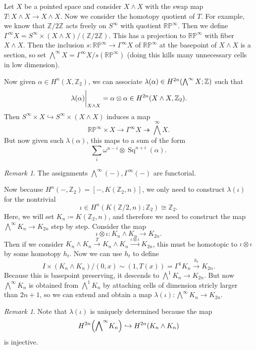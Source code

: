 \documentclass[leqno, openany]{memoir}
\theoremstyle{definition}
\theoremstyle{remark}
\newtheorem{rmk}[thm]{Remark}
\theoremstyle{plain}
\theoremstyle{definition}
\theoremstyle{remark}
\newcommand{\R}{\mathbb{R}}
\newcommand{\Z}{\mathbb{Z}}
\renewcommand{\P}{\mathbb{P}}
\DeclareMathOperator{\Sq}{Sq}
\begin{document}
Let $X$ be a pointed space and consider $X \wedge X$ with the swap map $T \colon X \wedge X \to X \wedge X$. Now we consider the homotopy quotient of $T$. For example, we know that $\Z/2\Z$ acts freely on $S^{\infty}$ with quotient $\R\P^{\infty}$. Then we define $\Gamma^{\infty} X = S^{\infty} \times (X \wedge X) / (\Z/2\Z)$. This has a projection to $\R\P^{\infty}$ with fiber $X \wedge X$. Then the inclusion $s \colon \R\P^{\infty} \to \Gamma^{\infty} X$ of $\R\P^{\infty}$ at the basepoint of $X \wedge X$ is a section, so set $\bigwedge^{\infty} X = \Gamma^{\infty} X / s(\R\P^{\infty})$ (doing this kills many unnecessary cells in low dimension).

Now given $\alpha \in H^n(X, \Z_2)$, we can associate $\lambda(\alpha) \in H^{2n}\qty(\bigwedge^{\infty} X; \Z)$ such that 
\[ \eval{\lambda(\alpha)}_{X \wedge X} = \alpha \otimes \alpha \in H^{2n}(X \wedge X, \Z_2). \] 
Then $S^{\infty} \times X \hookrightarrow S^{\infty} \times (X \wedge X)$ induces a map
\[ \R\P^{\infty} \times X \to \Gamma^{\infty} X \twoheadrightarrow {\bigwedge}^{\infty} X. \]
But now given such $\lambda(\alpha)$, this maps to a sum of the form
\[ \sum_i \omega^{n-i} \otimes \Sq^{n+i}(\alpha). \]

\begin{rmk}
    The assignments $\bigwedge^{\infty}(-), \Gamma^{\infty}(-)$ are functorial.
\end{rmk}

Now because $H^n(-, \Z_2) = [-, K(\Z_2, n)]$, we only need to construct $\lambda(\iota)$ for the nontrivial
\[ \iota \in H^n(K(\Z/2, n); \Z_2) \cong \Z_2. \]
Here, we will set $K_n \coloneqq K(\Z_2, n)$, and therefore we need to construct the map $\bigwedge^{\infty} K_n \to K_{2n}$ step by step. Consider the map
\[ \iota \otimes \iota \colon K_n \wedge K_n \to K_{2n}. \]
Then if we consider $K_n \wedge K_n \xrightarrow{T} K_n \wedge K_n \xrightarrow{\iota \otimes \iota} K_{2n}$, this must be homotopic to $\iota \otimes \iota$ by some homotopy $h_t$. Now we can use $h_t$ to define
\[ I \times (K_n \wedge K_n) / (0,x) \sim (1,T(x)) = \Gamma^1 K_n \xrightarrow{h_t} K_{2n}. \]
Because this is basepoint preserving, it descends to $\bigwedge^1 K_n \to K_{2n}$. But now $\bigwedge^{\infty} K_n$ is obtained from $\bigwedge^1 K_n$ by attaching cells of dimension stricly larger than $2n+1$, so we can extend and obtain a map $\lambda(\iota) \colon \bigwedge^{\infty} K_n \to K_{2n}$.

\begin{rmk}
    Note that $\lambda(\iota)$ is uniquely determined because the map
    \[ H^{2n}\qty({ \bigwedge }^{\infty} K_n) \hookrightarrow H^{2n}(K_n \wedge K_n) \]
    is injective.
\end{rmk}
\end{document}
